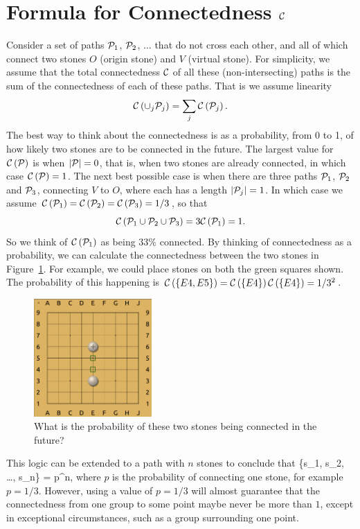 \documentclass[doublespacing, 12pt, a4paper]{article}
\begin{document}
\section*{Formula for Connectedness $\mathcal C$}
Consider a set of paths $\mathcal P_1$, $\mathcal P_2$, $\ldots$ that do not cross each other, and all of which connect two stones $O$ (origin stone) and $V$ (virtual stone).
For simplicity, we assume that the total connectedness $\mathcal C$ of all these (non-intersecting) paths is the sum of the connectedness of each of these paths.
That is we assume linearity
\[
\mathcal C \left( \cup_j \mathcal P_j \right) = \sum_j \mathcal C \left(\mathcal P_j\right).
\]
The best way to think about the connectedness is as a probability, from 0 to 1, of how likely two stones are to be connected in the future. The largest value for $\mathcal C \left( \mathcal P\right)$ is when $|\mathcal P| = 0$, that is, when two stones are already connected, in which case $\mathcal C \left( \mathcal P\right) = 1$. The next best possible case is when there are three paths $\mathcal P_1$, $\mathcal P_2$ and $\mathcal P_3$, connecting $V$ to $O$, where each has a length $|\mathcal P_j| =1$. In which case we assume $\mathcal C \left( \mathcal P_1 \right) = \mathcal C \left( \mathcal P_2 \right) =\mathcal C \left( \mathcal P_3 \right) = 1/3$, so that
\[
\mathcal C \left( \mathcal P_1 \cup \mathcal P_2 \cup \mathcal P_3  \right)= 3 \mathcal C \left( \mathcal P_1 \right) = 1.
\]
 So we think of $ \mathcal C \left( \mathcal P_1 \right)$ as being $33\%$ connected. By thinking of connectedness as a probability, we can calculate the connectedness between the two stones in Figure~\ref{fig:2SquareConnected}. For example, we could place stones on both the green squares shown. The probability of this happening is $\mathcal C \left( \{E4, E5\} \right) = \mathcal C \left( \{E4\} \right) \mathcal C \left( \{E4\} \right)  = 1/3^2$.
 \begin{figure}
\centering
\includegraphics[width=0.4\textwidth]{2SquareConnected}
\caption{What is the probability of these two stones being connected in the future?}
\label{fig:2SquareConnected}
\end{figure}
 This logic can be extended to a path with $n$ stones to conclude that
\be
\f{ \{s_1, s_2, \ldots, s_n\} }  = p^{n},
\label{eqn:Connectiveness}
\en
where $p$ is the probability of connecting one stone, for example $p=1/3$. However, using a value of $p=1/3$ will almost guarantee that the connectedness from one group to some point maybe never be more than $1$, except in exceptional circumstances, such as a group surrounding one point.
\end{document}
